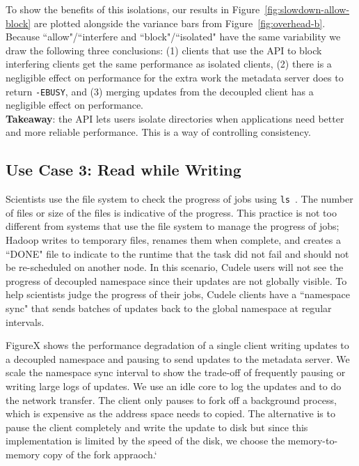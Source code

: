 To show the benefits of this isolations, our results in
Figure~\ref{fig:slowdown-allow-block} are plotted alongside the variance bars from
Figure~\ref{fig:overhead-b}. Because ``allow"/``interfere and
``block"/``isolated" have the same variability we draw the following three
conclusions: (1) clients that use the API to block interfering clients  get
the same performance as isolated clients, (2) there is a negligible effect on
performance for the extra work the metadata server does to return
\texttt{-EBUSY}, and (3) merging updates from the decoupled client has a
negligible effect on performance.\\

\noindent\textbf{Takeaway}: the API lets users isolate directories when
applications need better and more reliable performance. This is a way of
controlling consistency.

\subsection{Use Case 3: Read while Writing}

Scientists use the file system to check the progress of jobs using
\texttt{ls}~\cite{CITEME}. The number of files or size of the files is
indicative of the progress. This practice is not too different from systems
that use the file system to manage the progress of jobs; Hadoop writes to
temporary files, renames them when complete, and creates a ``DONE" file to
indicate to the runtime that the task did not fail and should not be
re-scheduled on another node. In this scenario, Cudele users will not see the
progress of decoupled namespace since their updates are not globally visible.
To help scientists judge the progress of their jobs, Cudele clients have a
``namespace sync" that sends batches of updates back to the global namespace at
regular intervals.

FigureX shows the performance degradation of a single client writing updates to
a decoupled namespace and pausing to send updates to the metadata server. We
scale the namespace sync interval to show the trade-off of frequently pausing
or writing large logs of updates.  We use an idle core to log the updates and
to do the network transfer. The client only pauses to fork off a background
process, which is expensive as the address space needs to copied. The
alternative is to pause the client completely and write the update to disk but
since this implementation is limited by the speed of the disk, we choose the
memory-to-memory copy of the fork appraoch.`

